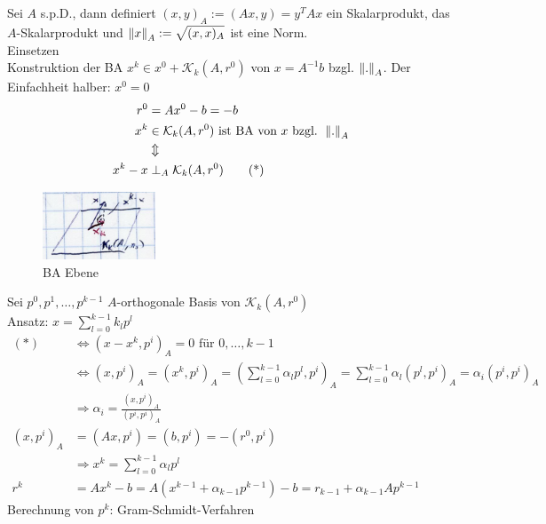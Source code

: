 \satz Sei $A$ s.p.D., dann definiert $(x,y)_A := (Ax, y) = y^TAx$ ein Skalarprodukt, das $A$-Skalarprodukt und
$\left\lVert x \right\rVert_A := \sqrt{(x,x)_A}$ ist eine Norm.\\
\beweis Einsetzen\\
Konstruktion der BA $x^k \in x^0 + \mathcal{K}_k(A,r^0)$ von $x = A^{-1}b$ bzgl. $\left\lVert . \right\rVert_A$.
Der Einfachheit halber: $x^0 = 0$
\begin{align*}
  r^0 &= Ax^0 - b = -b\\
  x^k &\in \mathcal{K}_k(A,r^0) \text{ ist BA von } x \text{ bzgl. } \left\lVert . \right\rVert_A\\
  &\Updownarrow\\
  x^k - x &\perp_A \mathcal{K}_k(A,r^0) \tag{*}
\end{align*}
\begin{figure}[htbp]
  \centering
  \includegraphics[width=0.3\textwidth]{figures/cg_ba.png}
  \caption{BA Ebene}
\end{figure}
Sei $p^0, p^1,\ldots,p^{k-1}$ $A$-orthogonale Basis von $\mathcal{K}_k(A,r^0)$\\
Ansatz: $x = \sum^{k-1}_{l=0} k_l p^l$
\begin{align*}
  (*) &\Leftrightarrow (x - x^k, p^i)_A = 0 \text{ für } 0,\ldots,k-1\\
      &\Leftrightarrow (x,p^i)_A = (x^k,p^i)_A = (\sum^{k-1}_{l=0} \alpha_l p^l, p^i)_A 
        = \sum^{k-1}_{l=0} \alpha_l(p^l, p^i)_A = \alpha_i(p^i, p^i)_A\\
      &\Rightarrow \alpha_i = \frac{(x,p^i)_A}{(p^i,p^i)_A} \\
      (x,p^i)_A &= (Ax,p^i) = (b,p^i) = -(r^0,p^i)\\
      &\Rightarrow x^k = \sum^{k-1}_{l=0} \alpha_l p^l\\
      r^k &= Ax^k - b = A(x^{k-1} + \alpha_{k-1}p^{k-1}) - b = r_{k-1} + \alpha_{k-1}Ap^{k-1}
\end{align*}
Berechnung von $p^k$: Gram-Schmidt-Verfahren\\

